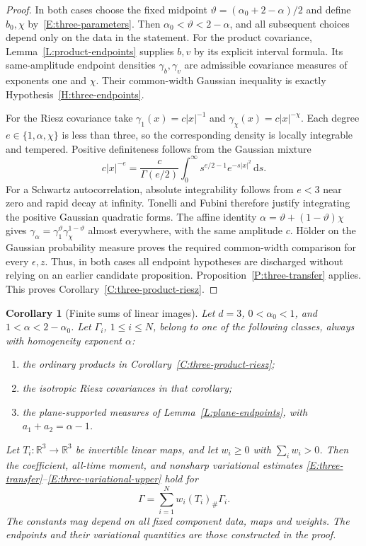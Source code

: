 \documentclass[12pt]{article}
\numberwithin{equation}{section}
\newtheorem{corollary}[theorem]{Corollary}
\theoremstyle{definition}
\newcommand{\R}{\mathbb{R}}
\newcommand{\ud}{\,\mathrm{d}}
\begin{document}
\begin{proof}
  In both cases choose the fixed midpoint
  $\vartheta=(\alpha_0+2-\alpha)/2$ and define $b_0,\chi$
  by~\eqref{E:three-parameters}. Then
  $\alpha_0<\vartheta<2-\alpha$, and all subsequent choices depend
  only on the data in the statement.
  For the product covariance, Lemma~\ref{L:product-endpoints} supplies
  $b,v$ by its explicit interval formula. Its same-amplitude endpoint
  densities $\gamma_b,\gamma_v$ are admissible covariance measures
  of exponents one and $\chi$. Their common-width Gaussian inequality
  is exactly Hypothesis~\ref{H:three-endpoints}.

  For the Riesz covariance take $\gamma_1(x)=c|x|^{-1}$ and
  $\gamma_\chi(x)=c|x|^{-\chi}$. Each degree $e\in\{1,\alpha,\chi\}$
  is less than three, so the corresponding density is locally integrable
  and tempered. Positive definiteness follows from the Gaussian mixture
  \[
    c|x|^{-e}=\frac{c}{\Gamma(e/2)}
    \int_0^\infty s^{e/2-1}e^{-s|x|^2}\ud s.
  \]
  For a Schwartz autocorrelation, absolute integrability follows from
  $e<3$ near zero and rapid decay at infinity. Tonelli and Fubini
  therefore justify integrating the positive Gaussian quadratic forms.
  The affine identity $\alpha=\vartheta+(1-\vartheta)\chi$ gives
  $\gamma_\alpha=\gamma_1^\vartheta\gamma_\chi^{1-\vartheta}$
  almost everywhere, with the same amplitude $c$. H\"older on the
  Gaussian probability measure proves the required common-width
  comparison for every $\epsilon,z$. Thus, in both cases all endpoint
  hypotheses are discharged without relying on an earlier candidate
  proposition. Proposition~\ref{P:three-transfer} applies. This proves
  Corollary~\ref{C:three-product-riesz}.
\end{proof}

\begin{corollary}[Finite sums of linear images]\label{C:three-finite-images}
  Let $d=3$, $0<\alpha_0<1$, and $1<\alpha<2-\alpha_0$.
  Let $\Gamma_i$, $1\le i\le N$, belong to one of the following
  classes, always with homogeneity exponent $\alpha$:
  \begin{enumerate}
    \item the ordinary products in Corollary~\ref{C:three-product-riesz};
    \item the isotropic Riesz covariances in that corollary;
    \item the plane-supported measures of Lemma~\ref{L:plane-endpoints},
      with $a_1+a_2=\alpha-1$.
  \end{enumerate}
  Let $T_i:\R^3\to\R^3$ be invertible linear maps, and let
  $w_i\ge0$ with $\sum_iw_i>0$. Then the coefficient, all-time
  moment, and nonsharp variational estimates
  \eqref{E:three-transfer}--\eqref{E:three-variational-upper}
  hold for
  \[
    \Gamma=\sum_{i=1}^Nw_i(T_i)_\#\Gamma_i.
  \]
  The constants may depend on all fixed component data, maps and
  weights. The endpoints and their variational quantities are
  those constructed in the proof.
\end{corollary}
\end{document}
